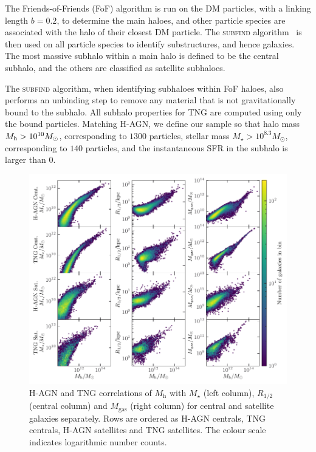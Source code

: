 \documentclass[usenatbib,useAMS]{mnras}
\begin{document}
The Friends-of-Friends (FoF) algorithm is run on the \ac{DM} particles, with a linking length $b=0.2$, to determine the main haloes, and other particle species are associated with the halo of their closest \ac{DM} particle. The \textsc{subfind} algorithm~\citep{Springel_2001,Dolag_2009} is then used on all particle species to identify substructures, and hence galaxies. The most massive subhalo within a main halo is defined to be the central subhalo, and the others are classified as satellite subhaloes.

The \textsc{subfind} algorithm, when identifying subhaloes within FoF haloes, also performs an unbinding step to remove any material that is not gravitationally bound to the subhalo. All subhalo properties for TNG are computed using only the bound particles. Matching H-AGN, we define our sample so that halo mass $M_{\rm h} > 10^{10} M_\odot$, corresponding to $1300$ particles, stellar mass $M_\star > 10^{8.3} M_\odot$, corresponding to $140$ particles, and the instantaneous SFR in the subhalo is larger than $0$.

\begin{figure}
    \centering
    \includegraphics[width=\textwidth]{Figures/sim_data.pdf}
    \caption{H-AGN and TNG correlations of $M_\mathrm{h}$ with $M_\star$ (left column), $R_{1/2}$ (central column) and $M_\mathrm{gas}$ (right column) for central and satellite galaxies separately. Rows are ordered as H-AGN centrals, TNG centrals, H-AGN satellites and TNG satellites. The colour scale indicates logarithmic number counts.}
    \label{fig:sim_data}
\end{figure}
\end{document}
